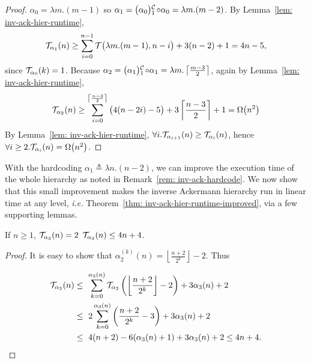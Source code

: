 \begin{proof}
	$\alpha_0 = \lambda m.(m-1)$ so $\alpha_1 = \cdt{\big(\alpha_0\big)}{1}\circ \alpha_0 = \lambda m.(m - 2)$. By Lemma~\ref{lem: inv-ack-hier-runtime},
	\begin{equation*}
	\mathcal{T}_{\alpha_1}(n) \ge \sum_{i=0}^{n-1} \mathcal{T}\big(\lambda m.(m-1), n - i\big) + 3(n - 2) + 1 = 4n - 5\text{,}
	\end{equation*}
	since $\mathcal{T}_{\alpha_0}(k) = 1$. Because $\alpha_2 = \cdt{\big(\alpha_1\big)}{1}\circ \alpha_1 = \lambda m.\left\lceil \frac{m-3}{2} \right\rceil$, again by Lemma~\ref{lem: inv-ack-hier-runtime},
	\begin{equation*}
	\mathcal{T}_{\alpha_2}(n)
	\ge \sum_{i=0}^{\left\lceil \frac{n-3}{2} \right\rceil} \big(4(n-2i) - 5\big) + 3\left\lceil \frac{n-3}{2} \right\rceil + 1
	= \Omega\big(n^2\big)
	\end{equation*}
	By Lemma~\ref{lem: inv-ack-hier-runtime}, $\forall i. \mathcal{T}_{\alpha_{i+1}}(n)\ge \mathcal{T}_{\alpha_i}(n)$, hence $\forall i\ge 2. \mathcal{T}_{\alpha_i}(n) = \Omega\big(n^2\big)$.
\end{proof}


With the hardcoding $\alpha_1 \triangleq \lambda n.(n - 2)$, we can improve the execution time of the whole hierarchy as noted in Remark~\ref{rem: inv-ack-hardcode}. We now show that this small improvement makes the inverse Ackermann hierarchy run in linear time at any level, \emph{i.e.} Theorem~\ref{thm: inv-ack-hier-runtime-improved}, via a few supporting lemmas.

\begin{lem} \label{lem: inv-ack-3-runtime}
	If $n\ge 1$, $\mathcal{T}_{\alpha_3}(n) = 2$ $\mathcal{T}_{\alpha_3}(n) \le 4n + 4$.
\end{lem}

\begin{proof}
	It is easy to show that $\alpha_2^{(k)}(n) = \left\lfloor \frac{n+2}{2^k} \right\rfloor - 2$. Thus
	
	\begin{equation*}
	\begin{aligned}
		\runtime_{\alpha_3}(n)
		&  \le \ \sum_{k=0}^{\alpha_{3}(n)}\runtime_{\alpha_2}\left(\left\lfloor \frac{n+2}{2^k} \right\rfloor - 2\right) + 3\alpha_{3}(n) + 2 \\
		& \le \ 2\sum_{k=0}^{\alpha_3(n)}\left(\frac{n+2}{2^k} - 3\right) + 3\alpha_3(n) + 2 \\
		& \le \ 4(n + 2) - 6(\alpha_3(n) + 1) + 3\alpha_3(n) + 2 \le 4n + 4.
	\end{aligned}
\end{equation*}
\end{proof}

